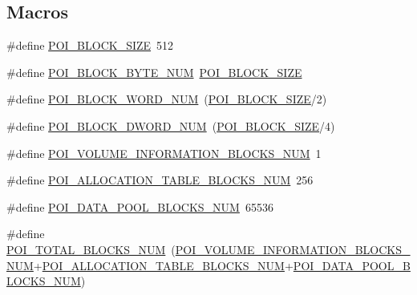 \subsection*{Macros}
\begin{DoxyCompactItemize}
\item 
\#define \hyperlink{file-manager_8h_afb59af7070cf0cd010913eef940ffbbd}{P\-O\-I\-\_\-\-B\-L\-O\-C\-K\-\_\-\-S\-I\-Z\-E}~512
\item 
\#define \hyperlink{file-manager_8h_ab4ee8ff3b1aa134fa74304c47f767131}{P\-O\-I\-\_\-\-B\-L\-O\-C\-K\-\_\-\-B\-Y\-T\-E\-\_\-\-N\-U\-M}~\hyperlink{file-manager_8h_afb59af7070cf0cd010913eef940ffbbd}{P\-O\-I\-\_\-\-B\-L\-O\-C\-K\-\_\-\-S\-I\-Z\-E}
\item 
\#define \hyperlink{file-manager_8h_a1323091f8cdc771e2fc912aa8168bd39}{P\-O\-I\-\_\-\-B\-L\-O\-C\-K\-\_\-\-W\-O\-R\-D\-\_\-\-N\-U\-M}~(\hyperlink{file-manager_8h_afb59af7070cf0cd010913eef940ffbbd}{P\-O\-I\-\_\-\-B\-L\-O\-C\-K\-\_\-\-S\-I\-Z\-E}/2)
\item 
\#define \hyperlink{file-manager_8h_a6a84ee9ea421e70befc839ad31498909}{P\-O\-I\-\_\-\-B\-L\-O\-C\-K\-\_\-\-D\-W\-O\-R\-D\-\_\-\-N\-U\-M}~(\hyperlink{file-manager_8h_afb59af7070cf0cd010913eef940ffbbd}{P\-O\-I\-\_\-\-B\-L\-O\-C\-K\-\_\-\-S\-I\-Z\-E}/4)
\item 
\#define \hyperlink{file-manager_8h_a87ede160157563bbccc56097d4c431d7}{P\-O\-I\-\_\-\-V\-O\-L\-U\-M\-E\-\_\-\-I\-N\-F\-O\-R\-M\-A\-T\-I\-O\-N\-\_\-\-B\-L\-O\-C\-K\-S\-\_\-\-N\-U\-M}~1
\item 
\#define \hyperlink{file-manager_8h_a555a4a22088989bb446cc085f19844ec}{P\-O\-I\-\_\-\-A\-L\-L\-O\-C\-A\-T\-I\-O\-N\-\_\-\-T\-A\-B\-L\-E\-\_\-\-B\-L\-O\-C\-K\-S\-\_\-\-N\-U\-M}~256
\item 
\#define \hyperlink{file-manager_8h_a6e4b52d19d492676f83a8576aba19a34}{P\-O\-I\-\_\-\-D\-A\-T\-A\-\_\-\-P\-O\-O\-L\-\_\-\-B\-L\-O\-C\-K\-S\-\_\-\-N\-U\-M}~65536
\item 
\#define \hyperlink{file-manager_8h_aab5f281daf18993acf5f25ae7fecef0d}{P\-O\-I\-\_\-\-T\-O\-T\-A\-L\-\_\-\-B\-L\-O\-C\-K\-S\-\_\-\-N\-U\-M}~(\hyperlink{file-manager_8h_a87ede160157563bbccc56097d4c431d7}{P\-O\-I\-\_\-\-V\-O\-L\-U\-M\-E\-\_\-\-I\-N\-F\-O\-R\-M\-A\-T\-I\-O\-N\-\_\-\-B\-L\-O\-C\-K\-S\-\_\-\-N\-U\-M}+\hyperlink{file-manager_8h_a555a4a22088989bb446cc085f19844ec}{P\-O\-I\-\_\-\-A\-L\-L\-O\-C\-A\-T\-I\-O\-N\-\_\-\-T\-A\-B\-L\-E\-\_\-\-B\-L\-O\-C\-K\-S\-\_\-\-N\-U\-M}+\hyperlink{file-manager_8h_a6e4b52d19d492676f83a8576aba19a34}{P\-O\-I\-\_\-\-D\-A\-T\-A\-\_\-\-P\-O\-O\-L\-\_\-\-B\-L\-O\-C\-K\-S\-\_\-\-N\-U\-M})

\end{DoxyCompactItemize}
